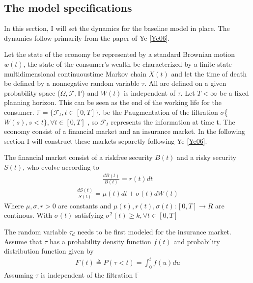 \documentclass[letterpaper,10pt,english]{jupyterBook}
\begin{document}
\subsection{The model specifications}
\label{\detokenize{Financial_application:the-model-specifications}}
\sphinxAtStartPar
In this section, I will set the dynamics for the baseline model in place. The dynamics follow primarily from the paper of Ye {[}\hyperlink{cite.Discussion:id8}{Ye06}{]}.

\sphinxAtStartPar
Let the state of the economy be represented by a standard Brownian motion \(w(t)\), the state of the consumer’s wealth be characterized by a finite state multi\sphinxhyphen{}dimensional continuous\sphinxhyphen{}time Markov chain \(X(t)\) and let the time of death be defined by a non\sphinxhyphen{}negative random variable \(\tau\). All are defined on a given probability space (\(\Omega, \mathcal{F}, \mathbb{P} \)) and \(W(t)\) is independent of \(\tau\). Let \(T< \infty\) be a fixed planning horizon. This can be seen as the end of the working life for the consumer. \(\mathbb{F} = \{\mathcal{F}_t, t \in [0,T]\}\), be the P\sphinxhyphen{}augmentation of the filtration \(\sigma\)\{\(W(s), s<t \}, \forall t \in [0,T]\) , so \(\mathcal{F}_t\) represents the information at time t. The economy consist of a financial market and an insurance market. In the following section I will construct these markets separetly following Ye {[}\hyperlink{cite.Discussion:id8}{Ye06}{]}.

\sphinxAtStartPar
The financial market consist of a risk\sphinxhyphen{}free security \(B(t)\) and a risky security \(S(t)\), who evolve according to
\begin{equation*}
\begin{split} \frac{dB(t)}{B(t)}=r(t)dt \end{split}
\end{equation*}\begin{equation*}
\begin{split} \frac{dS(t)}{S(t)}=\mu(t)dt+\sigma(t)dW(t)\end{split}
\end{equation*}
\sphinxAtStartPar
Where \(\mu, \sigma, r > 0\) are constants and \(\mu(t), r(t), \sigma(t): [0,T] \to R\) are continous. With \(\sigma(t)\) satisfying \(\sigma^2(t) \ge k, \forall t \in [0,T]\)

\sphinxAtStartPar
The random variable \(\tau_d\) needs to be first modeled for the insurance  market. Assume that \(\tau\) has a probability density function \(f(t)\) and probability distribution function given by
\begin{equation*}
\begin{split} F(t) \triangleq P(\tau < t) = \int_0^t f(u) du \end{split}
\end{equation*}
\sphinxAtStartPar
Assuming \(\tau\) is independent of the filtration \(\mathbb{F}\)
\end{document}
